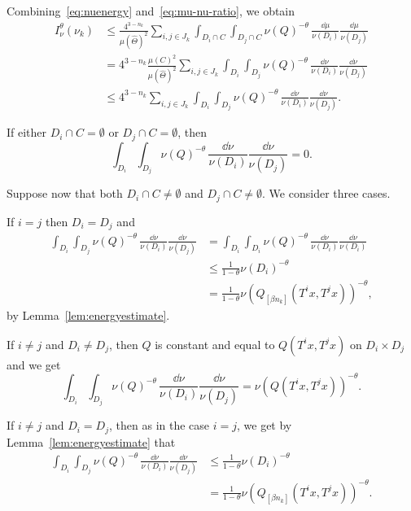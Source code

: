 Combining~\eqref{eq:nuenergy} and~\eqref{eq:mu-nu-ratio}, we obtain
\begin{align*}
I_\nu^\theta (\nu_k) &\leq \frac{4^{3-n_k}}{\mu (\hat{\Theta})^2}
\sum_{i,j \in J_k} \int_{D_i \cap C} \int_{D_j \cap C} \nu (Q)^{-\theta} \, \frac{\dd \mu}{\nu (D_i)} \frac{\dd
\mu}{\nu (D_j)} \\ &= 4^{3-n_k} \frac{\mu(C)^2}{\mu (\hat{\Theta})^2} \sum_{i,j \in J_k} \int_{D_i} \int_{D_j} \nu (Q)^{-\theta} \, \frac{\dd \nu}{\nu (D_i)} \frac{\dd
\nu}{\nu (D_j)} \\ &\leq 4^{3-n_k} \sum_{i,j \in J_k} \int_{D_i}
\int_{D_j} \nu (Q)^{-\theta} \, \frac{\dd \nu}{\nu (D_i)}
\frac{\dd \nu}{\nu (D_j)}.
\end{align*}

If either $D_i \cap C = \emptyset$ or $D_j \cap C = \emptyset$, then
\[
\int_{D_i} \int_{D_j} \nu (Q)^{-\theta} \, \frac{\dd \nu}{\nu (D_i)} \frac{\dd \nu}{\nu (D_j)} = 0.
\]

Suppose now that both $D_i \cap C \neq \emptyset$ and $D_j \cap C \neq
\emptyset$. We consider three cases.

\begin{step}[Case 1]
If $i = j$ then $D_i = D_j$ and
\begin{align*}
\int_{D_i} \int_{D_j} \nu (Q)^{-\theta} \, \frac{\dd \nu}{\nu (D_i)} \frac{\dd \nu}{\nu (D_j)} &= \int_{D_i} \int_{D_i}
\nu (Q)^{-\theta} \, \frac{\dd \nu}{\nu (D_i)}
\frac{\dd \nu}{\nu (D_i)} \\ &\leq \frac{1}{1 - \theta} \nu (D_i)^{-\theta} \\ &= \frac{1}{1-\theta} \nu (Q_{[\beta n_k]} (T^i x, T^j x))^{-\theta},
\end{align*}
by Lemma~\ref{lem:energyestimate}.
\end{step}

\begin{step}[Case 2]
If $i \neq j$ and $D_i \neq D_j$, then $Q$ is constant and equal to $Q(T^i x, T^j x)$ on $D_i \times D_j$ and we get
\[
\int_{D_i} \int_{D_j} \nu (Q)^{-\theta} \, \frac{\dd \nu}{\nu (D_i)} \frac{\dd \nu}{\nu (D_j)} = \nu (Q (T^i x, T^j x))^{-\theta}.
\]
\end{step}

\begin{step}[Case 3]
If $i \neq j$ and $D_i = D_j$, then as in the case $i = j$, we get by Lemma~\ref{lem:energyestimate} that
\begin{align*}
\int_{D_i} \int_{D_j} \nu (Q)^{-\theta} \, \frac{\dd \nu}{\nu (D_i)} \frac{\dd \nu}{\nu (D_j)} & \leq \frac{1}{1-\theta}
\nu (D_i)^{-\theta} \\ &= \frac{1}{1-\theta} \nu (Q_{[\beta n_k]} (T^i x, T^j x))^{-\theta}.
\end{align*}
\end{step}

